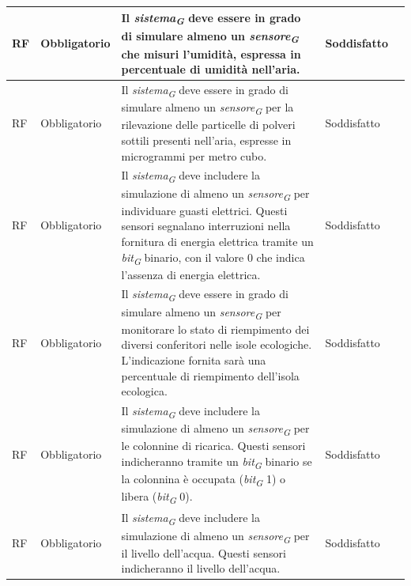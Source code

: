 \begin{longtable}{|C{1.5cm}|C{2cm}|L{5cm}|C{2cm}|C{1.5cm}|}
    \hline
     RF & Obbligatorio &  Il \textit{sistema}\textsubscript{\textit{G}} deve essere in grado di simulare almeno un \textit{sensore}\textsubscript{\textit{G}} che misuri l'umidità, espressa in percentuale di umidità nell'aria.& Soddisfatto \\
    
    \hline
     RF & Obbligatorio &  Il \textit{sistema}\textsubscript{\textit{G}} deve essere in grado di simulare almeno un \textit{sensore}\textsubscript{\textit{G}} per la rilevazione delle particelle di polveri sottili presenti nell'aria, espresse in microgrammi per metro cubo.& Soddisfatto \\
    
    \hline
     RF & Obbligatorio &  Il \textit{sistema}\textsubscript{\textit{G}} deve includere la simulazione di almeno un \textit{sensore}\textsubscript{\textit{G}} per individuare guasti elettrici. Questi sensori segnalano interruzioni nella fornitura di energia elettrica tramite un \textit{bit}\textsubscript{\textit{G}} binario, con il valore 0 che indica l'assenza di energia elettrica.& Soddisfatto \\
    
    \hline
     RF & Obbligatorio &  Il \textit{sistema}\textsubscript{\textit{G}} deve essere in grado di simulare almeno un \textit{sensore}\textsubscript{\textit{G}} per monitorare lo stato di riempimento dei diversi conferitori nelle isole ecologiche. L'indicazione fornita sarà una percentuale di riempimento dell'isola ecologica. & Soddisfatto \\
    
    \hline
     RF & Obbligatorio & Il \textit{sistema}\textsubscript{\textit{G}} deve includere la simulazione di almeno un \textit{sensore}\textsubscript{\textit{G}} per le colonnine di ricarica. Questi sensori indicheranno tramite un \textit{bit}\textsubscript{\textit{G}} binario se la colonnina è occupata (\textit{bit}\textsubscript{\textit{G}} 1) o libera (\textit{bit}\textsubscript{\textit{G}} 0).& Soddisfatto \\
    
    \hline
     RF & Obbligatorio & Il \textit{sistema}\textsubscript{\textit{G}} deve includere la simulazione di almeno un \textit{sensore}\textsubscript{\textit{G}} per il livello dell'acqua. Questi sensori indicheranno il livello dell'acqua.& Soddisfatto \\
    

\end{longtable}

